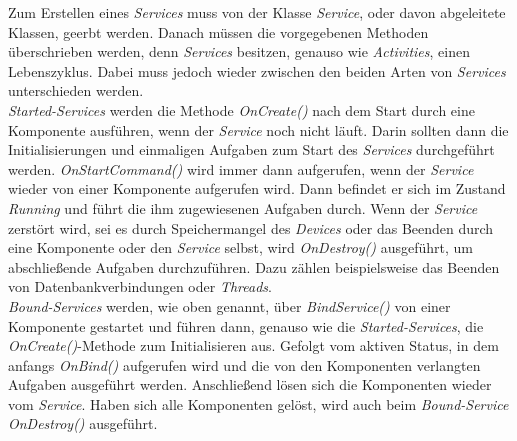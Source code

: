 Zum Erstellen eines \textit{Services} muss von der Klasse \textit{Service}, oder davon abgeleitete Klassen, geerbt werden. Danach müssen die vorgegebenen Methoden überschrieben werden, denn \textit{Services} besitzen, genauso wie \textit{Activities}, einen Lebenszyklus. Dabei muss jedoch wieder zwischen den beiden Arten von \textit{Services} unterschieden werden.\\
\textit{Started-Services} werden die Methode \textit{OnCreate()} nach dem Start durch eine Komponente ausführen, wenn der \textit{Service} noch nicht läuft. Darin sollten dann die Initialisierungen und einmaligen Aufgaben zum Start des \textit{Services} durchgeführt werden. \textit{OnStartCommand()} wird immer dann aufgerufen, wenn der \textit{Service} wieder von einer Komponente aufgerufen wird. Dann befindet er sich im Zustand \textit{Running} und führt die ihm zugewiesenen Aufgaben durch. Wenn der \textit{Service} zerstört wird, sei es durch Speichermangel des \textit{Devices} oder das Beenden durch eine Komponente oder den \textit{Service} selbst, wird \textit{OnDestroy()} ausgeführt, um abschließende Aufgaben durchzuführen. Dazu zählen beispielsweise das Beenden von Datenbankverbindungen oder \textit{Threads}.\\
\textit{Bound-Services} werden, wie oben genannt, über \textit{BindService()} von einer Komponente gestartet und führen dann, genauso wie die \textit{Started-Services}, die \textit{OnCreate()}-Methode zum Initialisieren aus. Gefolgt vom aktiven Status, in dem anfangs \textit{OnBind()} aufgerufen wird und die von den Komponenten verlangten Aufgaben ausgeführt werden. Anschließend lösen sich die Komponenten wieder vom \textit{Service}. Haben sich alle Komponenten gelöst, wird auch beim \textit{Bound-Service} \textit{OnDestroy()} ausgeführt.
